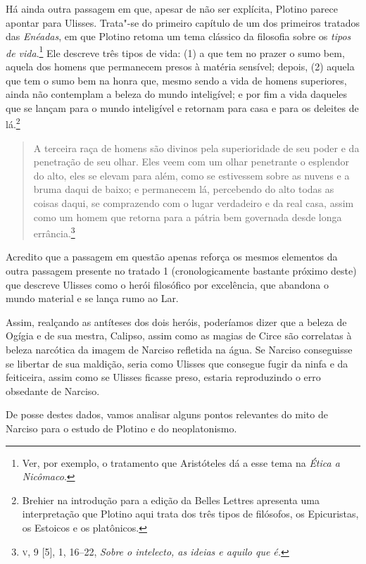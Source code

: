 Há ainda outra passagem em que, apesar de não ser explícita,
Plotino parece apontar para Ulisses. Trata"-se do primeiro capítulo de
um dos primeiros tratados das \emph{Enéadas}, em que Plotino retoma
um tema clássico da filosofia sobre os \emph{tipos de
vida}.\footnote{ Ver, por exemplo, o tratamento que Aristóteles dá a
esse tema na \emph{Ética a Nicômaco}.} Ele descreve três tipos de
vida: (1) a que tem no prazer o sumo bem, aquela dos homens que
permanecem presos à matéria sensível; depois, (2) aquela que tem o
sumo bem na honra que, mesmo sendo a vida de homens superiores, ainda
não contemplam a beleza do mundo inteligível; e por fim a vida
daqueles que se lançam para o mundo inteligível e retornam para casa
e para os deleites de lá.\footnote{ Brehier na introdução para a
edição da Belles Lettres apresenta uma interpretação que Plotino aqui
trata dos três tipos de filósofos, os Epicuristas, os Estoicos e os
platônicos.} 

\begin{quote}
A terceira raça de homens são divinos pela superioridade de seu poder
e da penetração de seu olhar. Eles veem com um olhar penetrante o
esplendor do alto, eles se elevam para além, como se estivessem sobre
as nuvens e a bruma daqui de baixo; e permanecem lá, percebendo do
alto todas as coisas daqui, se comprazendo com o lugar verdadeiro e
da real casa, assim como um homem que retorna para a pátria bem
governada desde longa errância.\footnote{ \textsc{v}, 9 [5], 1, 16--22,
\emph{Sobre o intelecto, as ideias e aquilo que é.}} 
\end{quote}

Acredito que a passagem em questão apenas reforça os mesmos elementos
da outra passagem presente no tratado 1 (cronologicamente bastante
próximo deste) que descreve Ulisses como o herói filosófico por
excelência, que abandona o mundo material e se lança rumo ao Lar. 

Assim, realçando as antíteses dos dois heróis, poderíamos dizer que a
beleza de Ogígia e de sua mestra, Calipso, assim como as magias de
Circe são correlatas à beleza narcótica da imagem de Narciso
refletida na água. Se Narciso conseguisse se libertar de sua
maldição, seria como Ulisses que consegue fugir da ninfa e da
feiticeira, assim como se Ulisses ficasse preso, estaria reproduzindo
o erro obsedante de Narciso.

De posse destes dados, vamos analisar alguns pontos relevantes do
mito de Narciso para o estudo de Plotino e do neoplatonismo.

